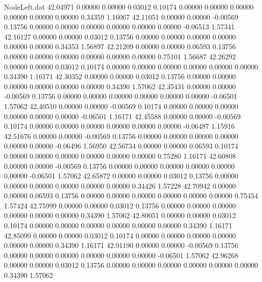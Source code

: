 \begin{filecontents}{NodeLeft.dat}
  42.04971    0.00000    0.00000     0.03012    0.10174    0.00000    0.00000    0.00000    0.00000    0.00000    0.00000    0.34359    1.16067
  42.11051    0.00000    0.00000    -0.00569    0.13756    0.00000    0.00000    0.00000    0.00000    0.00000    0.00000   -0.06513    1.57341
  42.16127    0.00000    0.00000     0.03012    0.13756    0.00000    0.00000    0.00000    0.00000    0.00000    0.00000    0.34353    1.56897
  42.21209    0.00000    0.00000     0.06593    0.13756    0.00000    0.00000    0.00000    0.00000    0.00000    0.00000    0.75101    1.56687
  42.26292    0.00000    0.00000     0.03012    0.10174    0.00000    0.00000    0.00000    0.00000    0.00000    0.00000    0.34390    1.16171
  42.30352    0.00000    0.00000     0.03012    0.13756    0.00000    0.00000    0.00000    0.00000    0.00000    0.00000    0.34390    1.57062
  42.35431    0.00000    0.00000    -0.00569    0.13756    0.00000    0.00000    0.00000    0.00000    0.00000    0.00000   -0.06501    1.57062
  42.40510    0.00000    0.00000    -0.00569    0.10174    0.00000    0.00000    0.00000    0.00000    0.00000    0.00000   -0.06501    1.16171
  42.45588    0.00000    0.00000    -0.00569    0.10174    0.00000    0.00000    0.00000    0.00000    0.00000    0.00000   -0.06487    1.15916
  42.51676    0.00000    0.00000    -0.00569    0.13756    0.00000    0.00000    0.00000    0.00000    0.00000    0.00000   -0.06496    1.56950
  42.56734    0.00000    0.00000     0.06593    0.10174    0.00000    0.00000    0.00000    0.00000    0.00000    0.00000    0.75280    1.16171
  42.60808    0.00000    0.00000    -0.00569    0.13756    0.00000    0.00000    0.00000    0.00000    0.00000    0.00000   -0.06501    1.57062
  42.65872    0.00000    0.00000     0.03012    0.13756    0.00000    0.00000    0.00000    0.00000    0.00000    0.00000    0.34426    1.57228
  42.70942    0.00000    0.00000     0.06593    0.13756    0.00000    0.00000    0.00000    0.00000    0.00000    0.00000    0.75454    1.57424
  42.75999    0.00000    0.00000     0.03012    0.13756    0.00000    0.00000    0.00000    0.00000    0.00000    0.00000    0.34390    1.57062
  42.80051    0.00000    0.00000     0.03012    0.10174    0.00000    0.00000    0.00000    0.00000    0.00000    0.00000    0.34390    1.16171
  42.85099    0.00000    0.00000     0.03012    0.10174    0.00000    0.00000    0.00000    0.00000    0.00000    0.00000    0.34390    1.16171
  42.91190    0.00000    0.00000    -0.00569    0.13756    0.00000    0.00000    0.00000    0.00000    0.00000    0.00000   -0.06501    1.57062
  42.96268    0.00000    0.00000     0.03012    0.13756    0.00000    0.00000    0.00000    0.00000    0.00000    0.00000    0.34390    1.57062

\end{filecontents}
